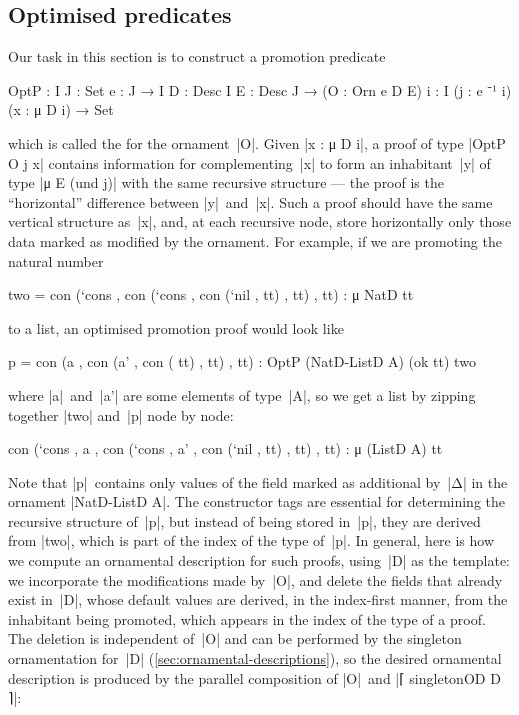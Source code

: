 \subsection{Optimised predicates}
\label{sec:optimised-predicates}

Our task in this section is to construct a promotion predicate
\begin{spec}
OptP :  {I J : Set} {e : J → I} {D : Desc I} {E : Desc J} →
        (O : Orn e D E) {i : I} (j : e ⁻¹ i) (x : μ D i) → Set
\end{spec}
which is called the  for the ornament~|O|.
Given |x : μ D i|, a proof of type |OptP O j x| contains information for complementing~|x| to form an inhabitant~|y| of type |μ E (und j)| with the same recursive structure --- the proof is the ``horizontal'' difference between |y|~and~|x|.
Such a proof should have the same vertical structure as~|x|, and, at each recursive node, store horizontally only those data marked as modified by the ornament.
For example, if we are promoting the natural number
\begin{code}
two =  con (`cons  ,
       con (`cons  ,
       con (`nil   ,
         tt) , tt) , tt) : μ NatD tt
\end{code}
to a list, an optimised promotion proof would look like
\begin{code}
p =  con (a   ,
     con (a'  ,
     con (
       tt) , tt) , tt) : OptP (NatD-ListD A) (ok tt) two
\end{code}
where |a|~and~|a'| are some elements of type~|A|, so we get a list by zipping together |two| and~|p| node by node:
\begin{code}
con (`cons  , a   ,
con (`cons  , a'  ,
con (`nil   ,
  tt) , tt) , tt) : μ (ListD A) tt
\end{code}
Note that |p|~contains only values of the field marked as additional by~|Δ| in the ornament |NatD-ListD A|.
The constructor tags are essential for determining the recursive structure of~|p|, but instead of being stored in~|p|, they are derived from |two|, which is part of the index of the type of~|p|.
In general, here is how we compute an ornamental description for such proofs, using~|D| as the template:
we incorporate the modifications made by~|O|, and delete the fields that already exist in~|D|, whose default values are derived, in the index-first manner, from the inhabitant being promoted, which appears in the index of the type of a proof.
The deletion is independent of~|O| and can be performed by the singleton ornamentation for~|D| (\autoref{sec:ornamental-descriptions}), so the desired ornamental description is produced by the parallel composition of |O|~and |⌈ singletonOD D ⌉|:

